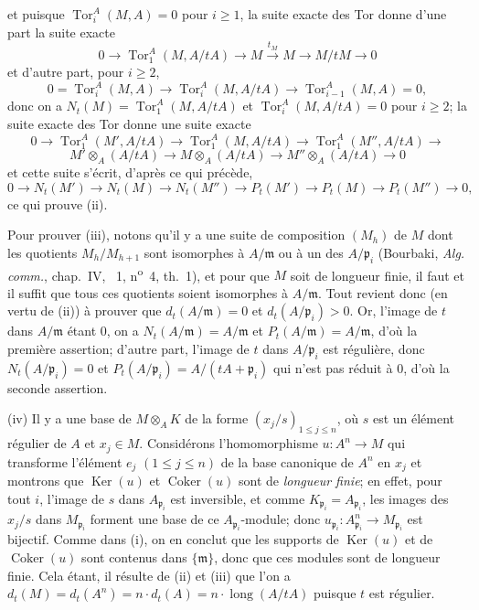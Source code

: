 et puisque $\operatorname{Tor}_i^A(M,A)=0$ pour $i\geq1$, la suite exacte des Tor donne d'une part la suite exacte
\[
  0\to\operatorname{Tor}_1^A(M,A/tA)\to M\xrightarrow{t_M}M\to M/tM\to0
\]
et d'autre part, pour $i\geq2$,
\[
  0=\operatorname{Tor}_i^A(M,A)\to\operatorname{Tor}_i^A(M,A/tA)\to\operatorname{Tor}_{i-1}^A(M,A)=0,
\]
donc on a $N_t(M)=\operatorname{Tor}_1^A(M,A/tA)$ et $\operatorname{Tor}_i^A(M,A/tA)=0$ pour $i\geq2$;
la suite exacte des Tor donne une suite exacte
\[
  0\to\operatorname{Tor}_1^A(M',A/tA)\to\operatorname{Tor}_1^A(M,A/tA)\to\operatorname{Tor}_1^A(M'',A/tA)\to
\]
\[
  M'\otimes_A(A/tA)\to M\otimes_A(A/tA)\to M''\otimes_A(A/tA)\to0
\]
et cette suite s'écrit, d'après ce qui précède,
\[
  0\to N_t(M')\to N_t(M)\to N_t(M'')\to P_t(M')\to P_t(M)\to P_t(M'')\to0,
\]
ce qui prouve (ii).

Pour prouver (iii), notons qu'il y a une suite de composition $(M_h)$ de $M$ dont les quotients $M_h/M_{h+1}$ sont isomorphes à $A/\mathfrak{m}$ ou à un des $A/\mathfrak{p}_i$ (Bourbaki, \emph{Alg. comm.}, chap.~IV, \textsection~1, n\textsuperscript{o}~4, th.~1), et pour que $M$ soit de longueur finie, il faut et il suffit que tous ces quotients soient isomorphes à $A/\mathfrak{m}$.
Tout revient donc (en vertu de (ii)) à prouver que $d_t(A/\mathfrak{m})=0$ et $d_t(A/\mathfrak{p}_i)>0$.
Or, l'image de $t$ dans $A/\mathfrak{m}$ étant $0$, on a $N_t(A/\mathfrak{m})=A/\mathfrak{m}$ et $P_t(A/\mathfrak{m})=A/\mathfrak{m}$, d'où la première assertion;
d'autre part, l'image de $t$ dans $A/\mathfrak{p}_i$ est régulière, donc $N_t(A/\mathfrak{p}_i)=0$ et $P_t(A/\mathfrak{p}_i)=A/(tA+\mathfrak{p}_i)$ qui n'est pas réduit à $0$, d'où la seconde assertion.

(iv) Il y a une base de $M\otimes_AK$ de la forme $(x_j/s)_{1\leq j\leq n}$, où $s$ est un élément régulier de $A$ et $x_j\in M$.
Considérons l'homomorphisme $u:A^n\to M$ qui transforme l'élément $e_j$ $(1\leq j\leq n)$ de la base canonique de $A^n$ en $x_j$ et montrons que $\operatorname{Ker}(u)$ et $\operatorname{Coker}(u)$ sont de \emph{longueur finie};
en effet, pour tout $i$, l'image de $s$ dans $A_{\mathfrak{p}_i}$ est inversible, et comme $K_{\mathfrak{p}_i}=A_{\mathfrak{p}_i}$, les images des $x_j/s$ dans $M_{\mathfrak{p}_i}$ forment une base de ce $A_{\mathfrak{p}_i}$-module;
donc $u_{\mathfrak{p}_i}:A_{\mathfrak{p}_i}^n\to M_{\mathfrak{p}_i}$ est bijectif.
Comme dans (i), on en conclut que les supports de $\operatorname{Ker}(u)$ et de $\operatorname{Coker}(u)$ sont contenus dans $\{\mathfrak{m}\}$, donc que ces modules sont de longueur finie.
Cela étant, il résulte de (ii) et (iii) que l'on a $d_t(M)=d_t(A^n)=n\cdot d_t(A)=n\cdot\operatorname{long}(A/tA)$ puisque $t$ est régulier.

